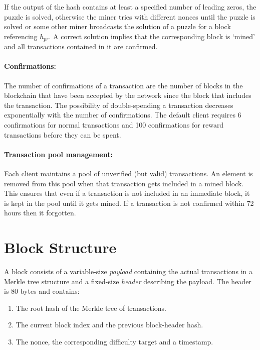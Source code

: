 \documentclass[]{report}   %
\begin{document}
If the output of the hash contains at least a specified number of leading zeros, the puzzle is solved, otherwise the miner tries with different nonces until the puzzle is solved or some other miner broadcasts the solution of a puzzle for a block referencing $h_{pr}$. A correct solution implies that the corresponding block is `mined' and all transactions contained in it are confirmed.

\paragraph{Confirmations:} The number of confirmations of a transaction are the number of blocks in the blockchain that have been accepted by the network since the block that includes the transaction. The possibility of double-spending a transaction decreases exponentially with the number of confirmations. The default client requires 6 confirmations for normal transactions and 100 confirmations for reward transactions before they can be spent.  

\paragraph{Transaction pool management:} Each client maintains a pool of unverified (but valid) transactions. An element is removed from this pool when that transaction gets included in a mined block. This ensures that even if a transaction is not included in an immediate block, it is kept in the pool until it gets mined. If a transaction is not confirmed within 72 hours then it forgotten. 

\section{Block Structure} 

A block consists of a variable-size {\em payload} containing the actual transactions in a Merkle tree structure and a fixed-size {\em header} describing the payload. The header is 80 bytes and contains: 
\begin{enumerate}
	\item The root hash of the Merkle tree of transactions.
	\item The current block index and the previous block-header hash.
	\item The nonce, the corresponding difficulty target and a timestamp.
\end{enumerate}
\end{document}
